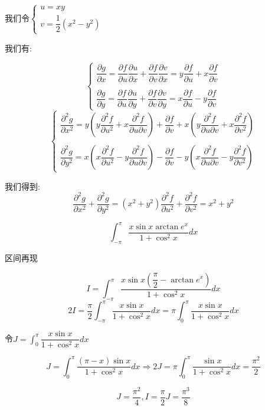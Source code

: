 \begin{solution}
	
	我们令$\left\lbrace 
	\begin{array}{l}
		u=xy\\
		v=\dfrac{1}{2}(x^2-y^2)
	\end{array}
	\right. $
	
	我们有: 
	
	$$\left\lbrace 
	\begin{array}{l}
		\dfrac{\partial g}{\partial x}=\dfrac{\partial f}{\partial u}\dfrac{\partial u}{\partial x}+\dfrac{\partial f}{\partial v}\dfrac{\partial v}{\partial x}=y\dfrac{\partial f}{\partial u}+x\dfrac{\partial f}{\partial v}\\
		
		\\
		\dfrac{\partial g}{\partial y}=\dfrac{\partial f}{\partial u}\dfrac{\partial u}{\partial y}+\dfrac{\partial f}{\partial v}\dfrac{\partial v}{\partial y}=x\dfrac{\partial f}{\partial u}-y\dfrac{\partial f}{\partial v}
	\end{array}
	\right. $$
	$$\left\lbrace 
	\begin{array}{l}
		\dfrac{\partial^2 g}{\partial x^2}=y(y\dfrac{\partial^2 f}{\partial u^2}+x\dfrac{\partial^2 f}{\partial u\partial v})+\dfrac{\partial f}{\partial v}+x(y\dfrac{\partial^2 f}{\partial u\partial v}+x\dfrac{\partial^2 f}{\partial v^2})\\
		
		\\
		\dfrac{\partial^2 g}{\partial y^2}=x(x\dfrac{\partial^2 f}{\partial u^2}-y\dfrac{\partial^2 f}{\partial u\partial v})-\dfrac{\partial f}{\partial v}-y(x\dfrac{\partial^2 f}{\partial u\partial v}-y\dfrac{\partial^2 f}{\partial v^2})
	\end{array}
	\right. $$
	
	我们得到: 
	$$\dfrac{\partial^2 g}{\partial x^2}+\dfrac{\partial^2 g}{\partial y^2}=(x^2+y^2)\dfrac{\partial^2 f}{\partial u^2}+\dfrac{\partial^2 f}{\partial v^2}=x^2+y^2$$
\end{solution}

\begin{example}[][Exam: 31.3.10]
	$$\int_{-\pi}^{\pi}\dfrac{x\sin x\arctan e^{x}}{1+\cos ^2 x}dx$$
\end{example}

\begin{solution}
	
	区间再现
	
	$$I=\int_{-\pi}^{\pi}\dfrac{x\sin x(\dfrac{\pi}{2}-\arctan e^{x})}{1+\cos ^2 x}dx$$
	$$2I=\dfrac{\pi}{2}\int_{-\pi}^{\pi}\dfrac{x\sin x}{1+\cos ^2 x}dx=\pi\int_{0}^{\pi}\dfrac{x\sin x}{1+\cos ^2 x}dx$$
	
	令$J=\int_{0}^{\pi}\dfrac{x\sin x}{1+\cos ^2 x}dx$
	
	$$J=\int_{0}^{\pi}\dfrac{(\pi-x)\sin x}{1+\cos ^2 x}dx\Rightarrow 2J=\pi\int_{0}^{\pi}\dfrac{\sin x}{1+\cos ^2 x}dx=\dfrac{\pi^2}{2}$$
	
	$$J=\dfrac{\pi^2}{4},I=\dfrac{\pi}{2}J=\dfrac{\pi^3}{8}$$
\end{solution}


